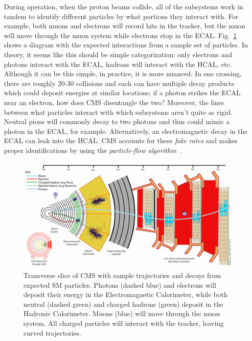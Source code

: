 During operation, when the proton beams collide, all of the subsystems work in tandem to identify different particles by what portions they interact with. For example, both muons and electrons will record hits in the tracker, but the muon will move through the muon system while electrons stop in the ECAL. Fig.~\ref{fig:CMSSliceWithTracks} shows a diagram with the expected interactions from a sample set of particles. In theory, it seems like this should be simple categorization: only electrons and photons interact with the ECAL, hadrons will interact with the HCAL, etc. Although it can be this simple, in practice, it is more nuanced. In one crossing, there are roughly 20-30 collisions and each can have multiple decay products which could deposit energies at similar locations; if a photon strikes the ECAL near an electron, how does CMS disentangle the two? Moreover, the lines between what particles interact with which subsystems aren't quite as rigid. Neutral pions will commonly decay to two photons and thus could mimic a photon in the ECAL, for example. Alternatively, an electromagnetic decay in the ECAL can leak into the HCAL. CMS accounts for these \textit{fake rates} and makes proper identifications by using the \textit{particle-flow algorithm}~\cite{}. 

\begin{figure}[htbp]
\begin{center}
\includegraphics[width=.9\linewidth]{Experiment/figures/CMSSliceWithTracks.png}
\caption[Trajectories and Decays for Particle Identification in CMS]{Transverse slice of CMS with sample trajectories and decays from expected SM particles. Photons (dashed blue) and electrons will deposit their energy in the Electromagnetic Calorimeter, while both neutral (dashed green) and charged hadrons (green) deposit in the Hadronic Calorimeter. Muons (blue) will move through the muon system. All charged particles will interact with the tracker, leaving curved trajectories.}
\label{fig:CMSSliceWithTracks}
\end{center}
\end{figure}

